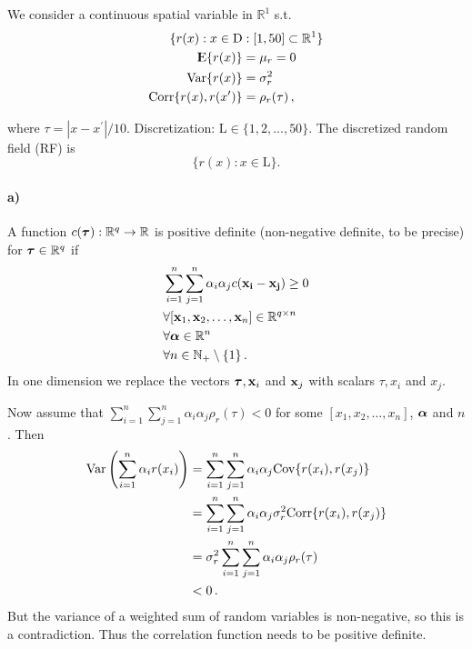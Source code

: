 We consider a continuous spatial variable in $\mathbb{R}^1$ s.t. 
\begin{align*}
    \{r(x): x \in \text{D} &: [1,50] \subset \mathbb{R}^1\} \\
    {\rm I\kern-.3em E}\{r(x)\} &= \mu_r = 0\\
    \mathrm{Var}\{r(x)\} & = \sigma_r^2 \\
    \mathrm{Corr}\{r(x), r(x')\} & = \rho_r(\tau) \, ,
\end{align*}

where $\tau = |x-x^\prime|/10.$ 
Discretization: $\text{L} \in \{1,2,...,50\}$.
The discretized random field (RF) is 
\begin{equation*}
    \{r(x): x \in \text{L}\}.
\end{equation*}

\paragraph{a)}
A function $c(\boldsymbol{\mathbf{\tau}}) : \mathbb{R}^q \rightarrow \mathbb{R}$ is positive definite (non-negative definite, to be precise) for $\boldsymbol{\mathbf{\tau}} \in \mathbb{R}^q$ if
%
\begin{equation*}
\begin{split}
    & \sum_{i=1}^n \sum_{j=1}^n \alpha_i \alpha_j c(\boldsymbol{\mathbf{x_i}} - \boldsymbol{\mathbf{x_j}}) \geq 0 \\
    & \forall [\boldsymbol{\mathbf{x}}_1, \boldsymbol{\mathbf{x}}_2, \dots, \boldsymbol{\mathbf{x}}_n] \in \mathbb{R}^{q \times n} \\
    & \forall \boldsymbol{\mathbf{\alpha}} \in \mathbb{R}^n \\
    & \forall n \in \mathbb{N}_+ \setminus \{1\} \, .
\end{split}
\end{equation*}
%
In one dimension we replace the vectors $\boldsymbol{\mathbf{\tau}}, \boldsymbol{\mathbf{x}}_i$ and $\boldsymbol{\mathbf{x}}_j$ with scalars $\tau, x_i$ and $x_j$.

Now assume that $\sum_{i=1}^n \sum_{j=1}^n \alpha_i \alpha_j \rho_r(\tau) < 0$ for some $[x_1, x_2, \dots, x_n]$, $\boldsymbol{\mathbf{\alpha}}$ and $n$. Then
%
\begin{align*}
    \mathrm{Var}\left(\sum_{i=1}^n \alpha_i r(x_i)\right) 
    &= \sum_{i=1}^n \sum_{j=1}^n \alpha_i \alpha_j \mathrm{Cov}\{r(x_i), r(x_j)\} \\
    &= \sum_{i=1}^n \sum_{j=1}^n \alpha_i \alpha_j \sigma^2_r \mathrm{Corr}\{r(x_i), r(x_j)\} \\
    &= \sigma^2_r \sum_{i=1}^n \sum_{j=1}^n \alpha_i \alpha_j \rho_r(\tau) \\
    &< 0 \, .
\end{align*}
%
But the variance of a weighted sum of random variables is non-negative, so this is a contradiction. Thus the correlation function needs to be positive definite.

